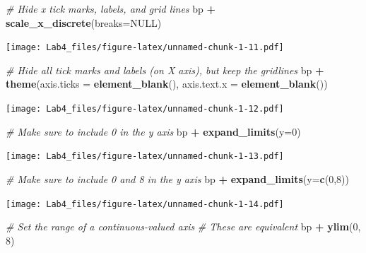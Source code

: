 \documentclass[]{article}
\newenvironment{Shaded}{\begin{snugshade}}{\end{snugshade}}
\newcommand{\KeywordTok}[1]{\textcolor[rgb]{0.13,0.29,0.53}{\textbf{#1}}}
\newcommand{\DataTypeTok}[1]{\textcolor[rgb]{0.13,0.29,0.53}{#1}}
\newcommand{\DecValTok}[1]{\textcolor[rgb]{0.00,0.00,0.81}{#1}}
\newcommand{\StringTok}[1]{\textcolor[rgb]{0.31,0.60,0.02}{#1}}
\newcommand{\CommentTok}[1]{\textcolor[rgb]{0.56,0.35,0.01}{\textit{#1}}}
\newcommand{\OtherTok}[1]{\textcolor[rgb]{0.56,0.35,0.01}{#1}}
\newcommand{\OperatorTok}[1]{\textcolor[rgb]{0.81,0.36,0.00}{\textbf{#1}}}
\newcommand{\NormalTok}[1]{#1}
\begin{document}
\begin{Shaded}
\begin{Highlighting}[]
\CommentTok{# Hide x tick marks, labels, and grid lines}
\NormalTok{bp }\OperatorTok{+}\StringTok{ }\KeywordTok{scale_x_discrete}\NormalTok{(}\DataTypeTok{breaks=}\OtherTok{NULL}\NormalTok{)}
\end{Highlighting}
\end{Shaded}

\texttt{[image: Lab4\_files/figure-latex/unnamed-chunk-1-11.pdf]}

\begin{Shaded}
\begin{Highlighting}[]
\CommentTok{# Hide all tick marks and labels (on X axis), but keep the gridlines}
\NormalTok{bp }\OperatorTok{+}\StringTok{ }\KeywordTok{theme}\NormalTok{(}\DataTypeTok{axis.ticks =} \KeywordTok{element_blank}\NormalTok{(), }\DataTypeTok{axis.text.x =} \KeywordTok{element_blank}\NormalTok{())}
\end{Highlighting}
\end{Shaded}

\texttt{[image: Lab4\_files/figure-latex/unnamed-chunk-1-12.pdf]}

\begin{Shaded}
\begin{Highlighting}[]
\CommentTok{# Make sure to include 0 in the y axis}
\NormalTok{bp }\OperatorTok{+}\StringTok{ }\KeywordTok{expand_limits}\NormalTok{(}\DataTypeTok{y=}\DecValTok{0}\NormalTok{)}
\end{Highlighting}
\end{Shaded}

\texttt{[image: Lab4\_files/figure-latex/unnamed-chunk-1-13.pdf]}

\begin{Shaded}
\begin{Highlighting}[]
\CommentTok{# Make sure to include 0 and 8 in the y axis}
\NormalTok{bp }\OperatorTok{+}\StringTok{ }\KeywordTok{expand_limits}\NormalTok{(}\DataTypeTok{y=}\KeywordTok{c}\NormalTok{(}\DecValTok{0}\NormalTok{,}\DecValTok{8}\NormalTok{))}
\end{Highlighting}
\end{Shaded}

\texttt{[image: Lab4\_files/figure-latex/unnamed-chunk-1-14.pdf]}

\begin{Shaded}
\begin{Highlighting}[]
\CommentTok{# Set the range of a continuous-valued axis}
\CommentTok{# These are equivalent}
\NormalTok{bp }\OperatorTok{+}\StringTok{ }\KeywordTok{ylim}\NormalTok{(}\DecValTok{0}\NormalTok{, }\DecValTok{8}\NormalTok{)}
\end{Highlighting}
\end{Shaded}
\end{document}
